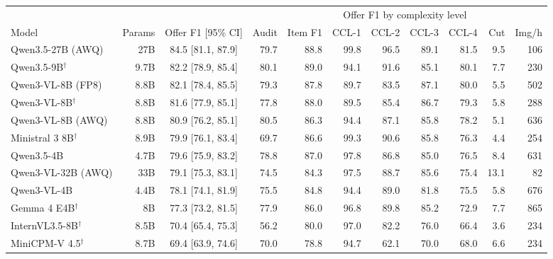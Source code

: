 \begin{tabular}{@{}lrcrrrrrrrr@{}}
\toprule
 & & & & & \multicolumn{4}{c}{Offer F1 by complexity level} & & \\
\cmidrule(lr){6-9}
Model & Params & Offer F1 [95\% CI] & Audit & Item F1 & CCL-1 & CCL-2 & CCL-3 & CCL-4 & Cut & Img/h \\
\midrule
Qwen3.5-27B (AWQ) & 27B & 84.5 [81.1, 87.9] & 79.7 & 88.8 & 99.8 & 96.5 & 89.1 & 81.5 & 9.5 & 106 \\
Qwen3.5-9B$^\dagger$ & 9.7B & 82.2 [78.9, 85.4] & 80.1 & 89.0 & 94.1 & 91.6 & 85.1 & 80.1 & 7.7 & 230 \\
Qwen3-VL-8B (FP8) & 8.8B & 82.1 [78.4, 85.5] & 79.3 & 87.8 & 89.7 & 83.5 & 87.1 & 80.0 & 5.5 & 502 \\
Qwen3-VL-8B$^\dagger$ & 8.8B & 81.6 [77.9, 85.1] & 77.8 & 88.0 & 89.5 & 85.4 & 86.7 & 79.3 & 5.8 & 288 \\
Qwen3-VL-8B (AWQ) & 8.8B & 80.9 [76.2, 85.1] & 80.5 & 86.3 & 94.4 & 87.1 & 85.8 & 78.2 & 5.1 & 636 \\
Ministral 3 8B$^\dagger$ & 8.9B & 79.9 [76.1, 83.4] & 69.7 & 86.6 & 99.3 & 90.6 & 85.8 & 76.3 & 4.4 & 254 \\
Qwen3.5-4B & 4.7B & 79.6 [75.9, 83.2] & 78.8 & 87.0 & 97.8 & 86.8 & 85.0 & 76.5 & 8.4 & 631 \\
Qwen3-VL-32B (AWQ) & 33B & 79.1 [75.3, 83.1] & 74.5 & 84.3 & 97.5 & 88.7 & 85.6 & 75.4 & 13.1 & 82 \\
Qwen3-VL-4B & 4.4B & 78.1 [74.1, 81.9] & 75.5 & 84.8 & 94.4 & 89.0 & 81.8 & 75.5 & 5.8 & 676 \\
Gemma 4 E4B$^\dagger$ & 8B & 77.3 [73.2, 81.5] & 77.9 & 86.0 & 96.8 & 89.8 & 85.2 & 72.9 & 7.7 & 865 \\
\midrule
InternVL3.5-8B$^\dagger$ & 8.5B & 70.4 [65.4, 75.3] & 56.2 & 80.0 & 97.0 & 82.2 & 76.0 & 66.4 & 3.6 & 234 \\
MiniCPM-V 4.5$^\dagger$ & 8.7B & 69.4 [63.9, 74.6] & 70.0 & 78.8 & 94.7 & 62.1 & 70.0 & 68.0 & 6.6 & 234 \\
\bottomrule
\end{tabular}
